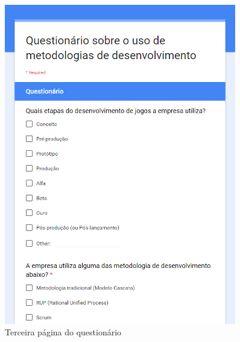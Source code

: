 \documentclass[quali]{ppgccufscar}
\begin{document}
\begin{figure}[htbp]
	\begin{center}
	\caption{Terceira página do questionário}
	\label{fig_anexoa3}
	\includegraphics[width=0.9\textwidth,natwidth=700,natheight=970]{anexoA3.jpg}
	\end{center}
\end{figure}
\end{document}

